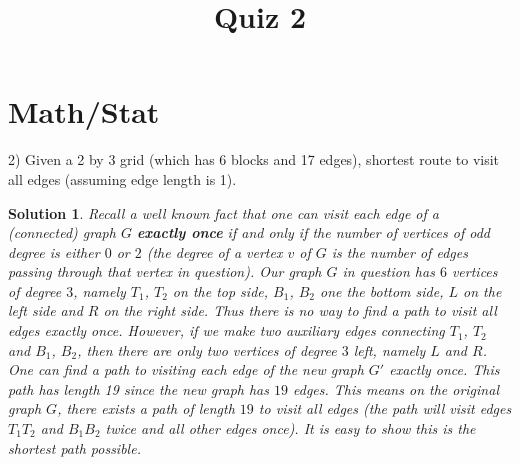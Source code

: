 \documentclass[12pt]{article}
\newtheorem{solution}[theorem]{Solution}
\begin{document}
\title{Quiz 2}
\maketitle
\section*{Math/Stat}

2) Given a 2 by 3 grid (which has 6 blocks and 17 edges), shortest route to visit all edges (assuming edge length is 1).\begin{solution}Recall a well known fact that one can visit each edge of a (connected) graph $G$ {\bf exactly once} if and only if the number of vertices of odd degree is either $0$ or $2$ (the degree of a vertex $v$ of $G$ is the number of edges passing through that vertex in question). Our graph $G$ in question has $6$ vertices of degree $3$, namely $T_1$, $T_2$ on the top side, $B_1$, $B_2$ one the bottom side, $L$ on the left side and $R$ on the right side.  Thus there is no way to find a path to visit all edges exactly once. However, if we make two auxiliary edges connecting $T_1$, $T_2$ and $B_1$, $B_2$, then there are only two vertices of degree $3$ left, namely $L$ and $R$. One can find a path to visiting each edge of the new graph $G'$ exactly once. This path has length 19 since the new graph has $19$ edges. This means on the original graph $G$, there exists a path of length $19$ to visit all edges (the path will visit edges $T_1T_2$ and $B_1B_2$ twice and all other edges once). It is easy to show this is the shortest path possible.

\end{solution}
\end{document}

